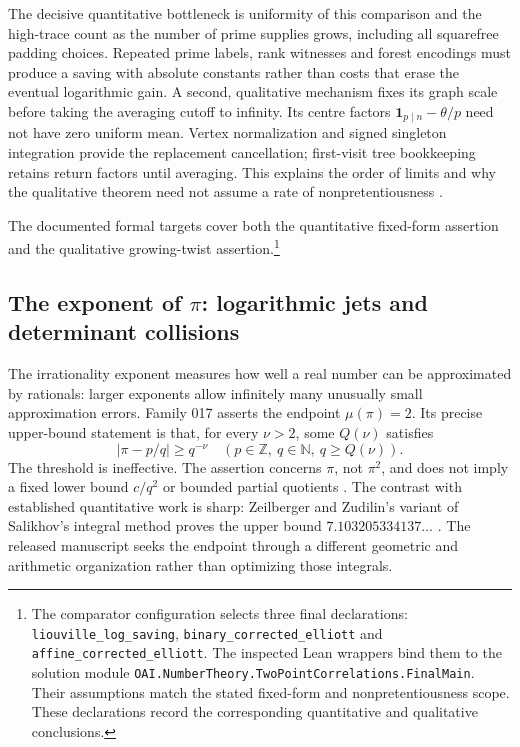 The decisive quantitative bottleneck is uniformity of this comparison and
the high-trace count as the number of prime supplies grows, including all
squarefree padding choices. Repeated prime labels, rank witnesses and forest
encodings must produce a saving with absolute constants rather than costs
that erase the eventual logarithmic gain. A second, qualitative mechanism
fixes its graph scale before taking the averaging cutoff to infinity.
Its centre factors $\mathbf1_{p\mid n}-\theta/p$ need not have zero uniform
mean. Vertex normalization and signed singleton integration provide the
replacement cancellation; first-visit tree bookkeeping retains return
factors until averaging. This explains the order of limits and why the
qualitative theorem need not assume a rate of nonpretentiousness
\cite{arithOpenAI007}.

The documented formal targets cover both the quantitative fixed-form
assertion and the qualitative growing-twist assertion.\footnote{The
comparator configuration selects three final declarations:
\texttt{liouville\_log\_saving}, \texttt{binary\_corrected\_elliott} and
\texttt{affine\_corrected\_elliott}. The inspected Lean wrappers bind them to
the solution module \texttt{OAI.NumberTheory.TwoPointCorrelations.FinalMain}.
Their assumptions match the stated fixed-form and nonpretentiousness scope.
These declarations record the corresponding quantitative and qualitative
conclusions.}

\subsection{The exponent of $\pi$: logarithmic jets and determinant collisions}
\label{sec:frontiers-pi-exponent}

The irrationality exponent measures how well a real number can be
approximated by rationals: larger exponents allow infinitely many
unusually small approximation errors. Family 017 asserts the endpoint
$\mu(\pi)=2$. Its precise upper-bound statement is that, for every $\nu>2$, some
$Q(\nu)$ satisfies
\[
 |\pi-p/q|\geq q^{-\nu}\quad(p\in\mathbb Z,\ q\in\mathbb N,\ q\geq Q(\nu)).
\]
The threshold is ineffective. The assertion concerns $\pi$, not $\pi^2$, and
does not imply a fixed lower bound $c/q^2$ or bounded partial quotients
\cite{arithOpenAI017}. The contrast with established quantitative work is
sharp: Zeilberger and Zudilin's variant of Salikhov's integral method proves
the upper bound $7.103205334137\ldots$ \cite{arithZZ2020}. The released
manuscript seeks the endpoint through a different geometric and arithmetic
organization rather than optimizing those integrals.

